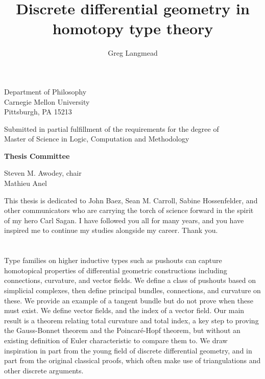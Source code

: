 \documentclass[12pt,fleqn]{article}
\title{Discrete differential geometry in homotopy type theory}
\author{Greg Langmead}
\numberwithin{equation}{section}
\renewenvironment{abstract}{\section*{\abstractname}}{}
\begin{document}
\begin{titlepage}
\maketitle
\thispagestyle{empty}

\begin{center}
Department of Philosophy\\
Carnegie Mellon University\\
Pittsburgh, PA 15213
\vspace{1in}

Submitted in partial fulfillment of the requirements for the degree of\\
Master of Science in Logic, Computation and Methodology
\vspace{1in}

\textbf{Thesis Committee}

Steven M. Awodey, chair\\
Mathieu Anel

\end{center}
\end{titlepage}

\thispagestyle{empty}
\begin{dedication}
This thesis is dedicated to John Baez, Sean M. Carroll, Sabine Hossenfelder, and other communicators who are carrying the torch of science forward in the spirit of my hero Carl Sagan. I have followed you all for many years, and you have inspired me to continue my studies alongside my career. Thank you.
\end{dedication}

\clearpage

\thispagestyle{empty}
\begin{abstract}
Type families on higher inductive types such as pushouts can capture homotopical properties of differential geometric constructions including connections, curvature, and vector fields. We define a class of pushouts based on simplicial complexes, then define principal bundles, connections, and curvature on these. We provide an example of a tangent bundle but do not prove when these must exist. We define vector fields, and the index of a vector field. Our main result is a theorem relating total curvature and total index, a key step to proving the Gauss-Bonnet theorem and the Poincaré-Hopf theorem, but without an existing definition of Euler characteristic to compare them to. We draw inspiration in part from the young field of discrete differential geometry, and in part from the original classical proofs, which often make use of triangulations and other discrete arguments.
\end{abstract}
\clearpage
\end{document}

